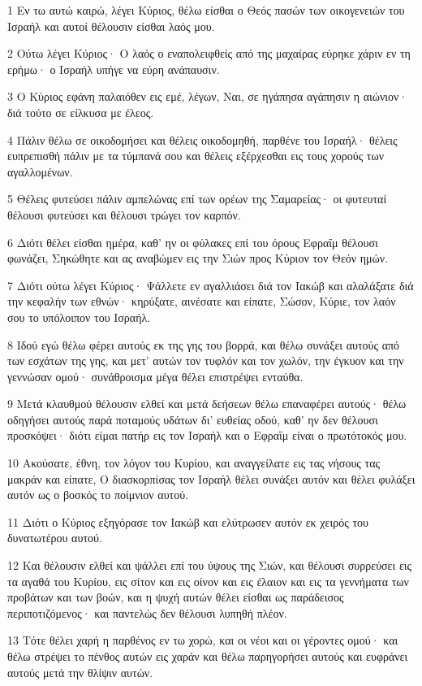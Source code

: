 \par 1 Εν τω αυτώ καιρώ, λέγει Κύριος, θέλω είσθαι ο Θεός πασών των οικογενειών του Ισραήλ και αυτοί θέλουσιν είσθαι λαός μου.
\par 2 Ούτω λέγει Κύριος· Ο λαός ο εναπολειφθείς από της μαχαίρας εύρηκε χάριν εν τη ερήμω· ο Ισραήλ υπήγε να εύρη ανάπαυσιν.
\par 3 Ο Κύριος εφάνη παλαιόθεν εις εμέ, λέγων, Ναι, σε ηγάπησα αγάπησιν η αιώνιον· διά τούτο σε είλκυσα με έλεος.
\par 4 Πάλιν θέλω σε οικοδομήσει και θέλεις οικοδομηθή, παρθένε του Ισραήλ· θέλεις ευπρεπισθή πάλιν με τα τύμπανά σου και θέλεις εξέρχεσθαι εις τους χορούς των αγαλλομένων.
\par 5 Θέλεις φυτεύσει πάλιν αμπελώνας επί των ορέων της Σαμαρείας· οι φυτευταί θέλουσι φυτεύσει και θέλουσι τρώγει τον καρπόν.
\par 6 Διότι θέλει είσθαι ημέρα, καθ' ην οι φύλακες επί του όρους Εφραΐμ θέλουσι φωνάζει, Σηκώθητε και ας αναβώμεν εις την Σιών προς Κύριον τον Θεόν ημών.
\par 7 Διότι ούτω λέγει Κύριος· Ψάλλετε εν αγαλλιάσει διά τον Ιακώβ και αλαλάξατε διά την κεφαλήν των εθνών· κηρύξατε, αινέσατε και είπατε, Σώσον, Κύριε, τον λαόν σου το υπόλοιπον του Ισραήλ.
\par 8 Ιδού εγώ θέλω φέρει αυτούς εκ της γης του βορρά, και θέλω συνάξει αυτούς από των εσχάτων της γης, και μετ' αυτών τον τυφλόν και τον χωλόν, την έγκυον και την γεννώσαν ομού· συνάθροισμα μέγα θέλει επιστρέψει ενταύθα.
\par 9 Μετά κλαυθμού θέλουσιν ελθεί και μετά δεήσεων θέλω επαναφέρει αυτούς· θέλω οδηγήσει αυτούς παρά ποταμούς υδάτων δι' ευθείας οδού, καθ' ην δεν θέλουσι προσκόψει· διότι είμαι πατήρ εις τον Ισραήλ και ο Εφραΐμ είναι ο πρωτότοκός μου.
\par 10 Ακούσατε, έθνη, τον λόγον του Κυρίου, και αναγγείλατε εις τας νήσους τας μακράν και είπατε, Ο διασκορπίσας τον Ισραήλ θέλει συνάξει αυτόν και θέλει φυλάξει αυτόν ως ο βοσκός το ποίμνιον αυτού.
\par 11 Διότι ο Κύριος εξηγόρασε τον Ιακώβ και ελύτρωσεν αυτόν εκ χειρός του δυνατωτέρου αυτού.
\par 12 Και θέλουσιν ελθεί και ψάλλει επί του ύψους της Σιών, και θέλουσι συρρεύσει εις τα αγαθά του Κυρίου, εις σίτον και εις οίνον και εις έλαιον και εις τα γεννήματα των προβάτων και των βοών, και η ψυχή αυτών θέλει είσθαι ως παράδεισος περιποτιζόμενος· και παντελώς δεν θέλουσι λυπηθή πλέον.
\par 13 Τότε θέλει χαρή η παρθένος εν τω χορώ, και οι νέοι και οι γέροντες ομού· και θέλω στρέψει το πένθος αυτών εις χαράν και θέλω παρηγορήσει αυτούς και ευφράνει αυτούς μετά την θλίψιν αυτών.
